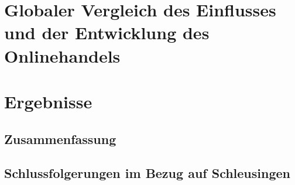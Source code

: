 \documentclass[a4paper, 12pt]{scrartcl}
\begin{document}
            
        
    \section{Globaler Vergleich des Einflusses und der Entwicklung des Onlinehandels}
            
        \newpage
        
        
        
    \section{Ergebnisse}
        \subsection{Zusammenfassung}
            
            
        \subsection{Schlussfolgerungen im Bezug auf Schleusingen}
            
        \newpage
        
        
        
    
        \newpage
        
    \listoffigures
        \newpage
        
    
    
        \newpage
    
    
    
        \newpage
    
        
        
\end{document}
